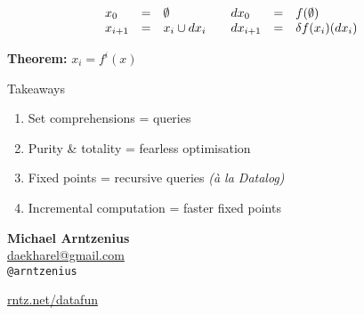 \documentclass[xcolor=table,usenames,dvipsnames,svgnames]{beamer}
\begin{document}
\begin{frame}\Large
  $$\begin{array}{lcl@{\hspace{2em}}lcl}
    x_0 &=& \emptyset
    & dx_0 &=& f(\emptyset)\\
    x_{i+1} &=& x_i \cup dx_i
    & dx_{i+1} &=& \delta f (x_i)(dx_i)\\
  \end{array}$$

  \vspace{1em}
  \textbf{Theorem:} $x_i = f^i(x)$
\end{frame}


\begin{frame}{Takeaways}\large
  \begin{enumerate}\itemsep 1em
  \item Set comprehensions = queries
  \item Purity \& totality = fearless optimisation
  \item Fixed points = recursive queries {\itshape\small (\`a la Datalog)}
  \item Incremental computation = faster fixed points
  \end{enumerate}

\end{frame}

\begin{frame}\Large
  \textbf{Michael Arntzenius}\\
  \href{mailto:daekharel@gmail.com}{daekharel@gmail.com}\\
  \texttt{@arntzenius}

  \vspace{1em}
  \centering \huge \url{rntz.net/datafun}
\end{frame}
\end{document}
